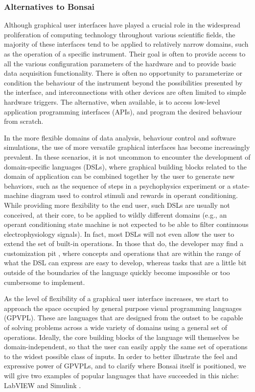 \subsubsection{Alternatives to Bonsai}

Although graphical user interfaces have played a crucial role in the widespread proliferation of computing technology throughout various scientific fields, the majority of these interfaces tend to be applied to relatively narrow domains, such as the operation of a specific instrument. Their goal is often to provide access to all the various configuration parameters of the hardware and to provide basic data acquisition functionality. There is often no opportunity to parameterize or condition the behaviour of the instrument beyond the possibilities presented by the interface, and interconnections with other devices are often limited to simple hardware triggers. The alternative, when available, is to access low-level application programming interfaces (APIs), and program the desired behaviour from scratch.

In the more flexible domains of data analysis, behaviour control and software simulations, the use of more versatile graphical interfaces has become increasingly prevalent. In these scenarios, it is not uncommon to encounter the development of domain-specific languages (DSLs), where graphical building blocks related to the domain of application can be combined together by the user to generate new behaviors, such as the sequence of steps in a psychophysics experiment or a state-machine diagram used to control stimuli and rewards in operant conditioning. While providing more flexibility to the end user, such DSLs are usually not conceived, at their core, to be applied to wildly different domains (e.g., an operant conditioning state machine is not expected to be able to filter continuous electrophysiology signals). In fact, most DSLs will not even allow the user to extend the set of built-in operations. In those that do, the developer may find a customization pit \cite{Cook2007}, where concepts and operations that are within the range of what the DSL can express are easy to develop, whereas tasks that are a little bit outside of the boundaries of the language quickly become impossible or too cumbersome to implement.

As the level of flexibility of a graphical user interface increases, we start to approach the space occupied by general purpose visual programming languages (GPVPL). These are languages that are designed from the outset to be capable of solving problems across a wide variety of domains using a general set of operations. Ideally, the core building blocks of the language will themselves be domain-independent, so that the user can easily apply the same set of operations to the widest possible class of inputs. In order to better illustrate the feel and expressive power of GPVPLs, and to clarify where Bonsai itself is positioned, we will give two examples of popular languages that have succeeded in this niche: LabVIEW \cite{Instruments2014} and Simulink \cite{MathWorks2014}.

